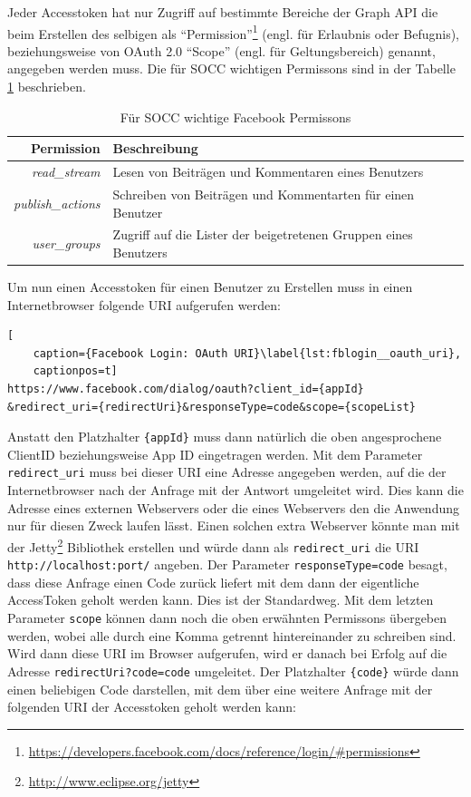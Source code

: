 Jeder Accesstoken hat nur Zugriff auf bestimmte Bereiche der Graph API die beim Erstellen des selbigen als \enquote{Permission}\footnote{\url{https://developers.facebook.com/docs/reference/login/\#permissions}} (engl. für Erlaubnis oder Befugnis), beziehungsweise von OAuth 2.0 \enquote{Scope} (engl. für Geltungsbereich) genannt, angegeben werden muss. Die für SOCC wichtigen Permissons sind in der Tabelle \ref{tbl:socc_facebook_persmissons} beschrieben.

\begin{table}[ht]
    \centering
    \caption{Für SOCC wichtige Facebook Permissons}
    \begin{tabular}{r|p{10cm}}
        \textbf{Permission} & 
        \textbf{Beschreibung} \\ 
        \hline
        \textit{read\_stream} & 
        Lesen von Beiträgen und Kommentaren eines Benutzers \\
        \textit{publish\_actions} & 
        Schreiben von Beiträgen und Kommentarten für einen Benutzer \\
        \textit{user\_groups} & 
        Zugriff auf die Lister der beigetretenen Gruppen eines Benutzers
    \end{tabular}
    \label{tbl:socc_facebook_persmissons}
\end{table}

Um nun einen Accesstoken für einen Benutzer zu Erstellen muss in einen Internetbrowser folgende URI aufgerufen werden:

\begin{lstlisting}[
    caption={Facebook Login: OAuth URI}\label{lst:fblogin__oauth_uri},
    captionpos=t]
https://www.facebook.com/dialog/oauth?client_id={appId}   &redirect_uri={redirectUri}&responseType=code&scope={scopeList}
\end{lstlisting}

Anstatt den Platzhalter \texttt{\{appId\}} muss dann natürlich die oben angesprochene ClientID beziehungsweise App ID eingetragen werden. Mit dem Parameter \texttt{redirect\_uri} muss bei dieser URI eine Adresse angegeben werden, auf die der Internetbrowser nach der Anfrage mit der Antwort umgeleitet wird. Dies kann die Adresse eines externen Webservers oder die eines Webservers den die Anwendung nur für diesen Zweck laufen lässt. Einen solchen extra Webserver könnte man mit der Jetty\footnote{\url{http://www.eclipse.org/jetty}} Bibliothek erstellen und würde dann als \texttt{redirect\_uri} die URI \texttt{http://localhost:{port}/} angeben. Der Parameter \texttt{responseType=code} besagt, dass diese Anfrage einen Code zurück liefert mit dem dann der eigentliche AccessToken geholt werden kann. Dies ist der Standardweg. Mit dem letzten Parameter \texttt{scope} können dann noch die oben erwähnten Permissons übergeben werden, wobei alle durch eine Komma getrennt hintereinander zu schreiben sind. Wird dann diese URI im Browser aufgerufen, wird er danach bei Erfolg auf die Adresse \texttt{{redirectUri}?code={code}} umgeleitet. Der Platzhalter \texttt{\{code\}} würde dann einen beliebigen Code darstellen, mit dem über eine weitere Anfrage mit der folgenden URI der Accesstoken geholt werden kann:

